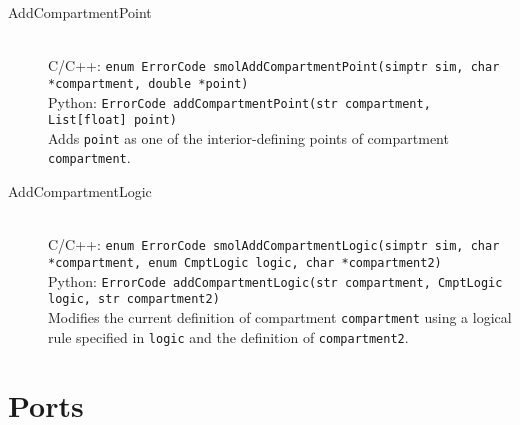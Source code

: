 \documentclass {scrbook}
\newcommand {\ttt} {\texttt}
\begin{document}
\begin{description}
\item[AddCompartmentPoint]
\hfill \\
C/C++: \ttt{enum ErrorCode smolAddCompartmentPoint(simptr sim, char *compartment, double *point)}\\
Python: \ttt{ErrorCode addCompartmentPoint(str compartment, List[float] point)}\\
Adds \ttt{point} as one of the interior-defining points of compartment \ttt{compartment}.

\item[AddCompartmentLogic]
\hfill \\
C/C++: \ttt{enum ErrorCode smolAddCompartmentLogic(simptr sim, char *compartment, enum CmptLogic logic, char *compartment2)}\\
Python: \ttt{ErrorCode addCompartmentLogic(str compartment, CmptLogic logic, str compartment2)}\\
Modifies the current definition of compartment \ttt{compartment} using a logical rule specified in \ttt{logic} and the definition of \ttt{compartment2}.

\end{description}


\section{Ports}
\end{document}

